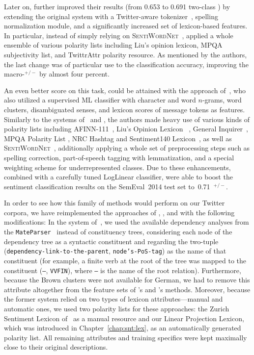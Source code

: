 Later on, \citet{Guenther:14} further improved their results (from
0.653 to 0.691 two-class \F) by extending the original system with a
Twitter-aware tokenizer~\cite{Owoputi:13}, spelling normalization
module, and a significantly increased set of lexicon-based features.
In particular, instead of simply relying on
\textsc{SentiWordNet}~\cite{Esuli:05}, \citeauthor{Guenther:14}
applied a whole ensemble of various polarity lists including Liu's
opinion lexicon, MPQA subjectivity list, and TwittrAttr polarity
resource.  As mentioned by the authors, the last change was of
particular use to the classification accuracy, improving the
macro-\F{}$^{+/-}$ by almost four percent.

An even better score on this task, could be attained with the approach
of~\citet{Miura:14}, who also utilized a supervised ML classifier with
character and word $n$-grams, word clusters, disambiguated senses, and
lexicon scores of message tokens as features.  Similarly to the
systems of~\citet{Mohammad:13} and \citet{Guenther:14}, the authors
made heavy use of various kinds of polarity lists including
AFINN-111~\cite{Nielsen:11}, Liu's Opinion Lexicon~\cite{Hu:04} ,
General Inquirer~\cite{Stone:66}, MPQA Polarity List \cite{Wiebe:05a},
NRC Hashtag and Sentiment140 Lexicon~\cite{Mohammad:13}, as well as
\textsc{SentiWordNet}~\cite{Esuli:06a}, additionally applying a whole
set of preprocessing steps such as spelling correction, part-of-speech
tagging with lemmatization, and a special weighting scheme for
underrepresented classes.  Due to these enhancements, combined with a
carefully tuned LogLinear classifier, \citet{Miura:14} were able to
boost the sentiment classification results on the SemEval~2014 test
set to~0.71~\F{}$^{+/-}$.

In order to see how this family of methods would perform on our
Twitter corpora, we have reimplemented the approaches of
\citet{Gamon:04}, \citet{Mohammad:13}, and \citet{Guenther:14} with
the following modifications: In the system of~\citet{Gamon:04}, we
used the available dependency analyses from the
\texttt{MateParser}~\cite{Bohnet:09} instead of constituency trees,
considering each node of the dependency tree as a syntactic
constituent and regarding the two-tuple
(\texttt{dependency-link-to-the-parent}, \texttt{node's-PoS-\-tag}) as
the name of that constituent (for example, a finite verb at the root
of the tree was mapped to the constituent (\texttt{--},
\texttt{VVFIN}), where \texttt{--} is the name of the root relation).
Furthermore, because the Brown clusters were not available for German,
we had to remove this attribute altogether from the feature sets of
\citeauthor{Mohammad:13}'s and \citeauthor{Guenther:14}'s methods.
Moreover, because the former system relied on two types of lexicon
attributes---manual and automatic ones, we used two polarity lists for
these approaches: the Zurich Sentiment Lexicon of~\citet{Clematide:10}
as a manual resource and our Linear Projection Lexicon, which was
introduced in Chapter~\ref{chap:snt:lex}, as an automatically
generated polarity list.  All remaining attributes and training
specifics were kept maximally close to their original descriptions.

